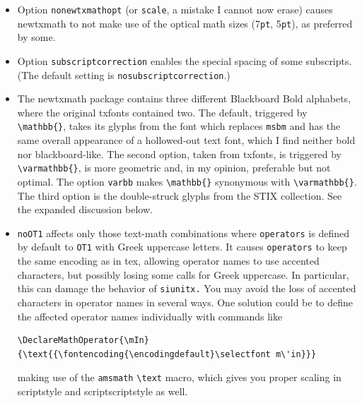 \documentclass[\fsc]{article}
\theoremstyle{oldplain}
\theoremstyle{plain}
\begin{document}
\begin{itemize}
\item Option {\tt nonewtxmathopt} (or {\tt scale}, a mistake I cannot now erase) causes newtxmath to not make use of the optical math sizes (7{\tt pt}, 5{\tt pt}), as preferred by some.
\item Option {\tt subscriptcorrection} enables the special spacing of some subscripts. (The default setting is {\tt nosubscriptcorrection}.)
\item The \textsf{newtxmath} package contains three different Blackboard Bold alphabets, where the original \textsf{txfonts} contained two. The default, triggered by \verb|\mathbb{}|, takes its glyphs from the font which replaces {\tt msbm} and has the same overall appearance of a hollowed-out text font, which I find neither bold nor blackboard-like. The second option, taken from \textsf{txfonts}, is triggered by \verb|\varmathbb{}|, is more geometric and, in my opinion, preferable but not optimal. The option {\tt varbb} makes \verb|\mathbb{}| synonymous with \verb|\varmathbb{}|. The third option is the double-struck glyphs from the STIX collection. See the expanded discussion below.
\item {\tt noOT1} affects only those text-math combinations where {\tt operators} is defined by default to {\tt OT1} with Greek uppercase letters. It causes {\tt operators} to keep the same encoding as in tex, allowing operator names to use accented characters, but possibly losing some calls for Greek uppercase. In particular, this can damage the behavior of {\tt siunitx.}
You may avoid the loss of accented characters in operator names in several ways. One solution could be to define the affected operator names individually with commands like
\begin{verbatim}
\DeclareMathOperator{\mIn}{\text{{\fontencoding{\encodingdefault}\selectfont m\'in}}}
\end{verbatim}
making use of  the {\tt amsmath} \verb|\text| macro, which gives you proper scaling in scriptstyle and scriptscriptstyle as well.


\end{itemize}
\end{document}
